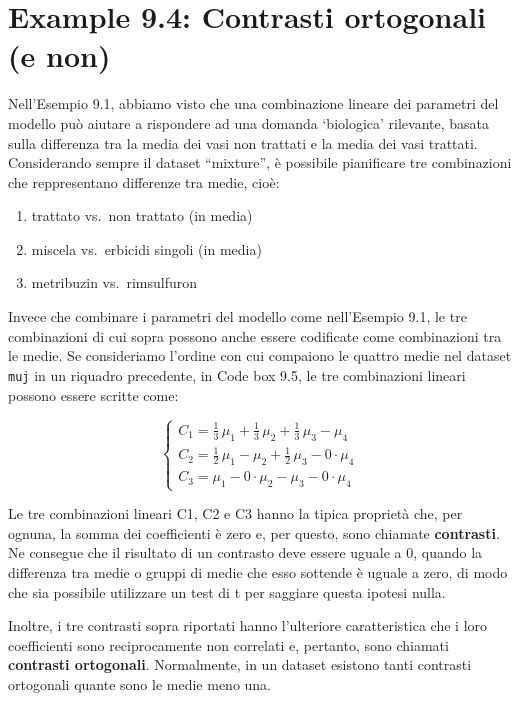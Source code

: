 \documentclass[
  12pt,
]{book}
\providecommand{\tightlist}{%
  \setlength{\itemsep}{0pt}\setlength{\parskip}{0pt}}
\begin{document}
\hypertarget{example-9.4-contrasti-ortogonali-e-non}{%
\section{Example 9.4: Contrasti ortogonali (e non)}\label{example-9.4-contrasti-ortogonali-e-non}}

Nell'Esempio 9.1, abbiamo visto che una combinazione lineare dei parametri del modello può aiutare a rispondere ad una domanda `biologica' rilevante, basata sulla differenza tra la media dei vasi non trattati e la media dei vasi trattati. Considerando sempre il dataset ``mixture'', è possibile pianificare tre combinazioni che reppresentano differenze tra medie, cioè:

\begin{enumerate}
\def\labelenumi{\arabic{enumi}.}
\tightlist
\item
  trattato vs.~non trattato (in media)
\item
  miscela vs.~erbicidi singoli (in media)
\item
  metribuzin vs.~rimsulfuron
\end{enumerate}

Invece che combinare i parametri del modello come nell'Esempio 9.1, le tre combinazioni di cui sopra possono anche essere codificate come combinazioni tra le medie. Se consideriamo l'ordine con cui compaiono le quattro medie nel dataset \texttt{muj} in un riquadro precedente, in Code box 9.5, le tre combinazioni lineari possono essere scritte come:

\[\left\{ {\begin{array}{l}
C_1 = \frac{1}{3} \, \mu_1 + \frac{1}{3} \, \mu_2 + \frac{1}{3} \,\mu_3 - \mu_4\\
C_2 = \frac{1}{2} \, \mu_1 - \mu_2 + \frac{1}{2} \,\mu_3 - 0 \cdot \mu_4\\
C_3 = \mu_1 - 0 \cdot \mu_2  - \mu_3 - 0 \cdot \mu_4
\end{array}} \right.\]

Le tre combinazioni lineari C1, C2 e C3 hanno la tipica proprietà che, per ognuna, la somma dei coefficienti è zero e, per questo, sono chiamate \textbf{contrasti}. Ne consegue che il risultato di un contrasto deve essere uguale a 0, quando la differenza tra medie o gruppi di medie che esso sottende è uguale a zero, di modo che sia possibile utilizzare un test di t per saggiare questa ipotesi nulla.

Inoltre, i tre contrasti sopra riportati hanno l'ulteriore caratteristica che i loro coefficienti sono reciprocamente non correlati e, pertanto, sono chiamati \textbf{contrasti ortogonali}. Normalmente, in un dataset esistono tanti contrasti ortogonali quante sono le medie meno una.
\end{document}
